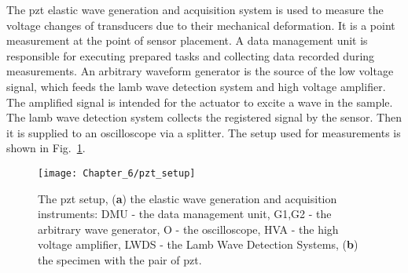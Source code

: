 The \ac{pzt} elastic wave generation and acquisition system is used to measure the voltage changes of transducers due to their mechanical deformation.
It is a point measurement at the point of sensor placement.
A data management unit is responsible for executing prepared tasks and collecting data recorded during measurements.
An arbitrary waveform generator is the source of the low voltage signal, which feeds the lamb wave detection system and high voltage amplifier.
The amplified signal is intended for the actuator to excite a wave in the sample.
The lamb wave detection system collects the registered signal by the sensor. 
Then it is supplied to an oscilloscope via a splitter.
The setup used for measurements is shown in Fig.~\ref{fig:pzt_setup}.
\begin{figure}[t]
	\begin{center}
		\texttt{[image: Chapter\_6/pzt\_setup]}
	\end{center}
	\caption{The \acf{pzt} setup, (\textbf{a}) the elastic wave generation and acquisition instruments:  DMU - the data management unit, G1,G2 - the arbitrary wave generator, O - the oscilloscope, HVA - the high voltage amplifier, LWDS - the Lamb Wave Detection Systems, (\textbf{b}) the specimen with the pair of \ac{pzt}.}
	\label{fig:pzt_setup}
\end{figure}

